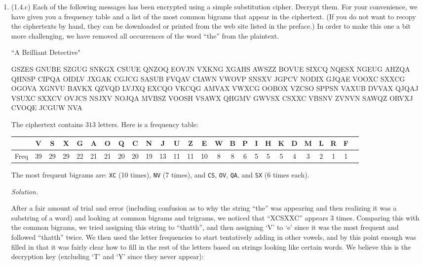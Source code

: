 \documentclass[12pt]{amsart}
\theoremstyle{definition}
\begin{document}
\begin{enumerate}
\bigskip

\item (1.4.c) Each of the following messages has been encrypted using a simple
	substitution cipher. Decrypt them. For your convenience, we have given
	you a frequency table and a list of the most common bigrams that appear
	in the ciphertext. (If you do not want to recopy the ciphertexts by
	hand, they can be downloaded or printed from the web site listed in the
	preface.) In order to make this one a bit more challenging, we have
	removed all occurrences of the word “the” from the plaintext. 

	``A Brilliant Detective"
	\begin{center}
		\ttfamily
		GSZES GNUBE SZGUG SNKGX CSUUE QNZOQ EOVJN VXKNG XGAHS AWSZZ
		BOVUE SIXCQ NQESX NGEUG AHZQA QHNSP CIPQA OIDLV JXGAK CGJCG
		SASUB FVQAV CIAWN VWOVP SNSXV JGPCV NODIX GJQAE VOOXC SXXCG
		OGOVA XGNVU BAVKX QZVQD LVJXQ EXCQO VKCQG AMVAX VWXCG OOBOX
		VZCSO SPPSN VAXUB DVVAX QJQAJ VSUXC SXXCV OVJCS NSJXV NOJQA
		MVBSZ VOOSH VSAWX QHGMV GWVSX CSXXC VBSNV ZVNVN SAWQZ ORVXJ
		CVOQE JCGUW NVA
	\end{center}
		
	The ciphertext contains $313$ letters. Here is a frequency table: 
	\begin{center}
		\ttfamily
		\begin{tabular}{|c||c |c |c |c |c |c |c |c |c |c |c |c |c |c |c |c |c |c |c |c |c |c |c| c| c|}
			\hline
			& V & S & X & G & A & O & Q & C & N & J & U & Z & E & W
			& B & P & I & H & K & D & M & L & R & F \\
			\hline
			Freq  & 39 & 29 & 29 & 22 & 21 & 21 & 20 & 20 & 19 & 13
			      & 11 & 11 & 10 & 8 & 8 & 6 & 5 & 5 & 5 & 4 & 3 &
			2 & 1 & 1 \\
			\hline
		\end{tabular}
	\end{center}

	The most frequent bigrams are: \texttt{XC} (10 times), \texttt{NV} (7
	times), and \texttt{CS}, \texttt{OV}, \texttt{QA}, and \texttt{SX} (6
	times each).

	\medskip
	\textit{Solution.}
	
	After a fair amount of trial and error (including confusion as to why the string ``the'' was appearing and then realizing it was a substring of a word) and looking at common bigrams and trigrams, we noticed that ``XCSXXC'' appears 3 times. Comparing this with the common bigrams, we tried assigning this string to ``thatth'', and then assigning `V' to `e' since it was the most frequent and followed ``thatth'' twice. We then used the letter frequencies to start tentatively adding in other vowels, and by this point enough was filled in that it was fairly clear how to fill in the rest of the letters based on strings looking like certain words. We believe this is the decryption key (excluding `T' and `Y' since they never appear):


\end{enumerate}
\end{document}
